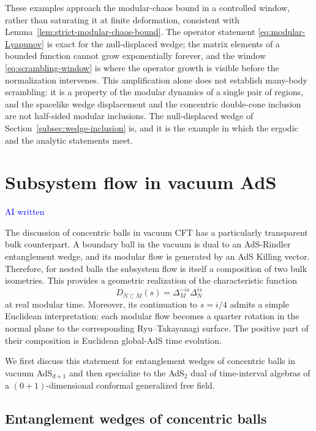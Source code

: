 \documentclass[a4paper,11pt]{article}
\theoremstyle{definition}
\newcommand{\NL}[1]{\textcolor{blue}{#1}}
\begin{document}
These examples approach the modular-chaos bound in a controlled window, rather than saturating it at finite deformation, consistent with Lemma~\ref{lem:strict-modular-chaos-bound}. The operator statement \eqref{eq:modular-Lyapunov} is exact for the null-displaced wedge; the matrix elements of a bounded function cannot grow exponentially forever, and the window \eqref{eq:scrambling-window} is where the operator growth is visible before the normalization intervenes. This amplification alone does not establish many-body scrambling: it is a property of the modular dynamics of a single pair of regions, and the spacelike wedge displacement and the concentric double-cone inclusion are not half-sided modular inclusions. The null-displaced wedge of Section~\ref{subsec:wedge-inclusion} is, and it is the example in which the ergodic and the analytic statements meet.

\section{Subsystem flow in vacuum AdS}
\label{sec:bulk-subsystem-flow}

\NL{AI written}

The discussion of concentric balls in vacuum CFT has a particularly
transparent bulk counterpart. A boundary ball in the vacuum is dual to an
AdS-Rindler entanglement wedge, and its modular flow is generated by an AdS
Killing vector. Therefore, for nested balls the subsystem flow is itself a
composition of two bulk isometries. This provides a geometric realization
of the characteristic function
\begin{equation}
    D_{N\subset M}(s)
    =
    \Delta_M^{-is}\Delta_N^{is}
\end{equation}
at real modular time. Moreover, its continuation to $s=i/4$ admits a
simple Euclidean interpretation: each modular flow becomes a quarter
rotation in the normal plane to the corresponding Ryu--Takayanagi
surface. The positive part of their composition is Euclidean global-AdS
time evolution.

We first discuss this statement for entanglement wedges of concentric
balls in vacuum AdS$_{d+1}$ and then specialize to the AdS$_2$ dual of
time-interval algebras of a $(0+1)$-dimensional conformal generalized free
field.

\subsection{Entanglement wedges of concentric balls}
\end{document}
